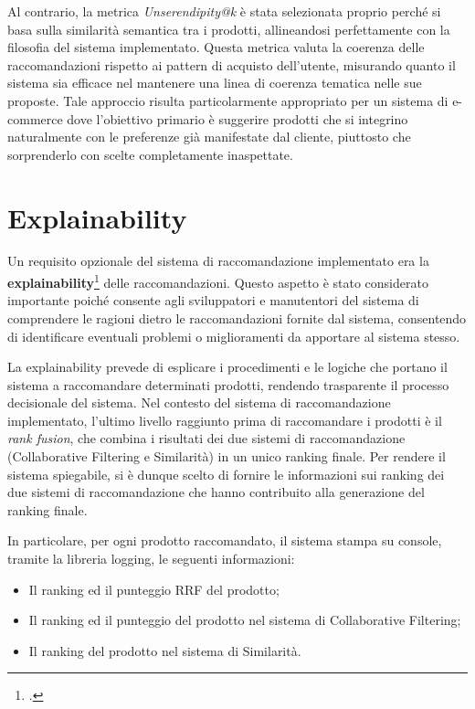 Al contrario, la metrica \emph{Unserendipity@k} è stata selezionata proprio perché si basa sulla similarità semantica tra i prodotti, allineandosi perfettamente con la filosofia del sistema implementato. Questa metrica valuta la coerenza delle raccomandazioni rispetto ai pattern di acquisto dell'utente, misurando quanto il sistema sia efficace nel mantenere una linea di coerenza tematica nelle sue proposte. Tale approccio risulta particolarmente appropriato per un sistema di e-commerce dove l'obiettivo primario è suggerire prodotti che si integrino naturalmente con le preferenze già manifestate dal cliente, piuttosto che sorprenderlo con scelte completamente inaspettate.


\section{Explainability}

Un requisito opzionale del sistema di raccomandazione implementato era la \textbf{\gls{explainability}}\footcite{site:explainable-ai} delle raccomandazioni. Questo aspetto è stato considerato importante poiché consente agli sviluppatori e manutentori del sistema di comprendere le ragioni dietro le raccomandazioni fornite dal sistema, consentendo di identificare eventuali problemi o miglioramenti da apportare al sistema stesso.

La explainability prevede di esplicare i procedimenti e le logiche che portano il sistema a raccomandare determinati prodotti, rendendo trasparente il processo decisionale del sistema. Nel contesto del sistema di raccomandazione implementato, l'ultimo livello raggiunto prima di raccomandare i prodotti è il \emph{rank fusion}, che combina i risultati dei due sistemi di raccomandazione (Collaborative Filtering e Similarità) in un unico ranking finale. Per rendere il sistema spiegabile, si è dunque scelto di fornire le informazioni sui ranking dei due sistemi di raccomandazione che hanno contribuito alla generazione del ranking finale.

In particolare, per ogni prodotto raccomandato, il sistema stampa su console, tramite la libreria \gls{logging}, le seguenti informazioni:
\begin{itemize}
    \item Il ranking ed il punteggio RRF del prodotto;
    \item Il ranking ed il punteggio del prodotto nel sistema di Collaborative Filtering;
    \item Il ranking del prodotto nel sistema di Similarità.
\end{itemize}

